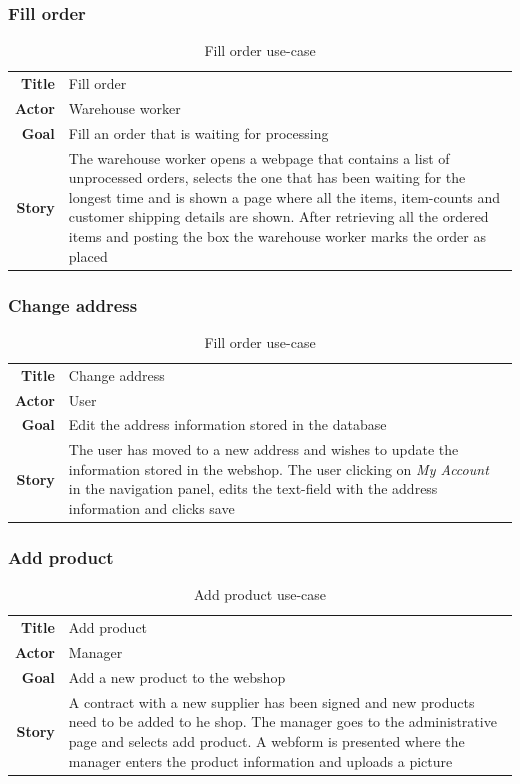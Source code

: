 \documentclass[12pt, a4paper,titlepage]{article}
\begin{document}
\subsubsection{Fill order}
\begin{table}[H]
\centering
\begin{tabular}{r | p{12cm}}
\textbf{Title} & Fill order \\
\textbf{Actor} & Warehouse worker \\
\textbf{Goal} & Fill an order that is waiting for processing \\
\textbf{Story} & The warehouse worker opens a webpage that contains a list of
unprocessed orders, selects the one that has been waiting for the longest time and is shown a page where all the items, item-counts and customer shipping
details are shown. 
After retrieving all the ordered items and posting the box  the warehouse worker marks the order as placed\\
\end{tabular}
\caption{Fill order use-case}
\end{table}

\subsubsection{Change address}
\begin{table}[H]
\centering
\begin{tabular}{r | p{12cm}}
\textbf{Title} & Change address \\
\textbf{Actor} & User \\
\textbf{Goal} & Edit the address information stored in the database \\
\textbf{Story} & The user has moved to a new address and wishes to update
the information stored in the webshop. The user clicking on \emph{My Account}
in the navigation panel, edits the text-field with the address information and
clicks save \\
\end{tabular}
\caption{Fill order use-case}
\end{table}

\subsubsection{Add product}
\begin{table}[H]
\centering
\begin{tabular}{r | p{12cm}}
\textbf{Title} & Add product \\
\textbf{Actor} & Manager \\
\textbf{Goal} & Add a new product to the webshop \\
\textbf{Story} & A contract with a new supplier has been signed and new products need to be added to he shop. The manager goes to the administrative page and selects add product. A webform is presented where the manager enters the product information and uploads a picture \\
\end{tabular}
\caption{Add product use-case}
\end{table}
\end{document}
